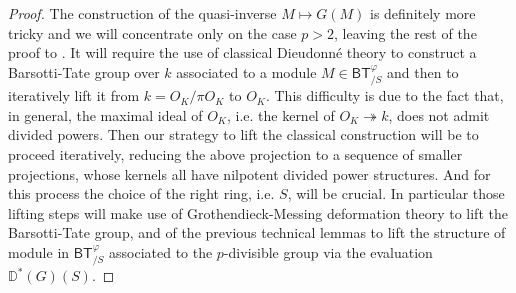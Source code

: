 \begin{proof}
The construction of the quasi-inverse $M \mapsto G(M)$
is definitely more tricky and we will concentrate only on
the case $p > 2$, leaving the rest of the proof to \cite{Kisin}.
It will require the use of classical Dieudonné theory to construct a
Barsotti-Tate group over $k$ associated to a module $M \in \mathsf{BT}^{\varphi}_{/S}$
and then to iteratively lift it from $k = O_K/\pi O_K$ to $O_K$.
This difficulty is due to the fact that, in general, the maximal
ideal of $O_K$, i.e. the kernel of $O_K \twoheadrightarrow k$, 
does not admit divided powers.
Then our strategy to lift the classical construction will be to
proceed iteratively, reducing the above projection to a sequence of
smaller projections, whose kernels all have nilpotent divided power structures.
And for this process the choice of the right ring, i.e$.$ $S$, will be crucial.
In particular those lifting steps will make use of Grothendieck-Messing
deformation theory to lift the Barsotti-Tate group, and of the previous
technical lemmas to lift the structure of module in $\mathsf{BT}^{\varphi}_{/S}$
associated to the $p$-divisible group via the 
evaluation $\mathbb{D}^*(G)(S)$.



\end{proof}
